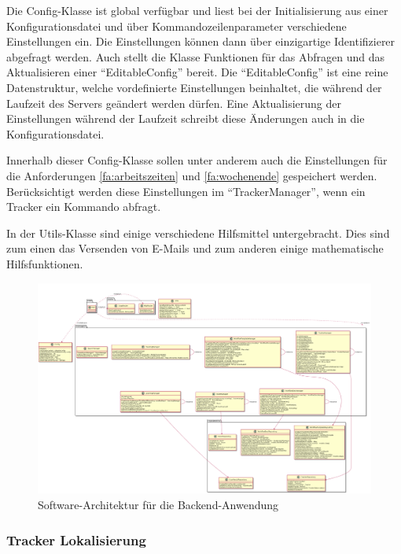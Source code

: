 Die Config-Klasse ist global verfügbar und liest bei der Initialisierung aus einer Konfigurationsdatei
und über Kommandozeilenparameter verschiedene Einstellungen ein.
Die Einstellungen können dann über einzigartige Identifizierer abgefragt werden.
Auch stellt die Klasse Funktionen für das Abfragen und das Aktualisieren einer \enquote{EditableConfig} bereit.
Die \enquote{EditableConfig} ist eine reine Datenstruktur, welche vordefinierte Einstellungen beinhaltet, die während
der Laufzeit des Servers geändert werden dürfen.
Eine Aktualisierung der Einstellungen während der Laufzeit schreibt diese Änderungen auch in die Konfigurationsdatei.

Innerhalb dieser Config-Klasse sollen unter anderem auch die Einstellungen für die Anforderungen \ref{fa:arbeitszeiten}
und \ref{fa:wochenende} gespeichert werden.
Berücksichtigt werden diese Einstellungen im \enquote{TrackerManager}, wenn ein Tracker ein Kommando abfragt.

In der Utils-Klasse sind einige verschiedene Hilfsmittel untergebracht.
Dies sind zum einen das Versenden von E-Mails und zum anderen einige mathematische Hilfsfunktionen.

\begin{figure}
	\includegraphics[width=.9\textheight]{images/server_architecture.png}
	\caption{Software-Architektur für die Backend-Anwendung}
	\label{fig:software-architecture}
\end{figure}

\FloatBarrier
\subsubsection{Tracker Lokalisierung} \label{sec:server-tracking}


